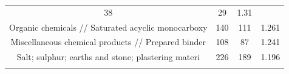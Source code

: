 \documentclass[10pt,]{article}
\begin{document}
\begin{longtable}[]{@{}cccc@{}}
\begin{minipage}[t]{0.21\columnwidth}
38\strut
\end{minipage} & \begin{minipage}[t]{0.20\columnwidth}\centering\strut
29\strut
\end{minipage} & \begin{minipage}[t]{0.09\columnwidth}\centering\strut
1.31\strut
\end{minipage}\tabularnewline
\begin{minipage}[t]{0.38\columnwidth}\centering\strut
Organic chemicals // Saturated acyclic monocarboxy\strut
\end{minipage} & \begin{minipage}[t]{0.21\columnwidth}\centering\strut
140\strut
\end{minipage} & \begin{minipage}[t]{0.20\columnwidth}\centering\strut
111\strut
\end{minipage} & \begin{minipage}[t]{0.09\columnwidth}\centering\strut
1.261\strut
\end{minipage}\tabularnewline
\begin{minipage}[t]{0.38\columnwidth}\centering\strut
Miscellaneous chemical products // Prepared binder\strut
\end{minipage} & \begin{minipage}[t]{0.21\columnwidth}\centering\strut
108\strut
\end{minipage} & \begin{minipage}[t]{0.20\columnwidth}\centering\strut
87\strut
\end{minipage} & \begin{minipage}[t]{0.09\columnwidth}\centering\strut
1.241\strut
\end{minipage}\tabularnewline
\begin{minipage}[t]{0.38\columnwidth}\centering\strut
Salt; sulphur; earths and stone; plastering materi\strut
\end{minipage} & \begin{minipage}[t]{0.21\columnwidth}\centering\strut
226\strut
\end{minipage} & \begin{minipage}[t]{0.20\columnwidth}\centering\strut
189\strut
\end{minipage} & \begin{minipage}[t]{0.09\columnwidth}\centering\strut
1.196\strut
\end{minipage}\tabularnewline
\begin{minipage}[t]{0.38\columnwidth}\centering\strut

\end{minipage}
\end{longtable}
\end{document}
